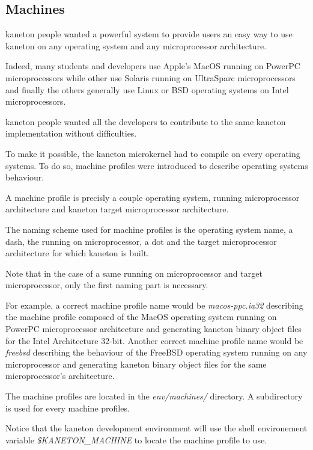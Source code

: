 %
%

\subsection{Machines}

kaneton people wanted a powerful system to provide users an easy way
to use kaneton on any operating system and any microprocessor architecture.

Indeed, many students and developers use Apple's MacOS running on PowerPC
microprocessors while other use Solaris running on UltraSparc microprocessors
and finally the others generally use Linux or BSD operating systems on
Intel microprocessors.

kaneton people wanted all the developers to contribute to the same
kaneton implementation without difficulties.

To make it possible, the kaneton microkernel had to compile on
every operating systems. To do so, machine profiles were introduced to
describe operating systems behaviour.

A machine profile is precisly a couple operating system, running
microprocessor architecture and kaneton target microprocessor architecture.

The naming scheme used for machine profiles is the operating system name,
a dash, the running on microprocessor, a dot and the target microprocessor
architecture for which kaneton is built.

Note that in the case of a same running on microprocessor and target
microprocessor, only the first naming part is necessary.

For example, a correct machine profile name would be
\textit{macos-ppc.ia32} describing the machine profile composed of the MacOS
operating system running on PowerPC microprocessor architecture and generating
kaneton binary object files for the Intel Architecture 32-bit. Another correct
machine profile name would be \textit{freebsd} describing the behaviour of
the FreeBSD operating system running on any microprocessor and generating
kaneton binary object files for the same microprocessor's architecture.

The machine profiles are located in the \textit{env/machines/} directory.
A subdirectory is used for every machine profiles.

Notice that the kaneton development environment will use the shell
environement variable \textit{\$KANETON\_MACHINE} to locate the
machine profile to use.

